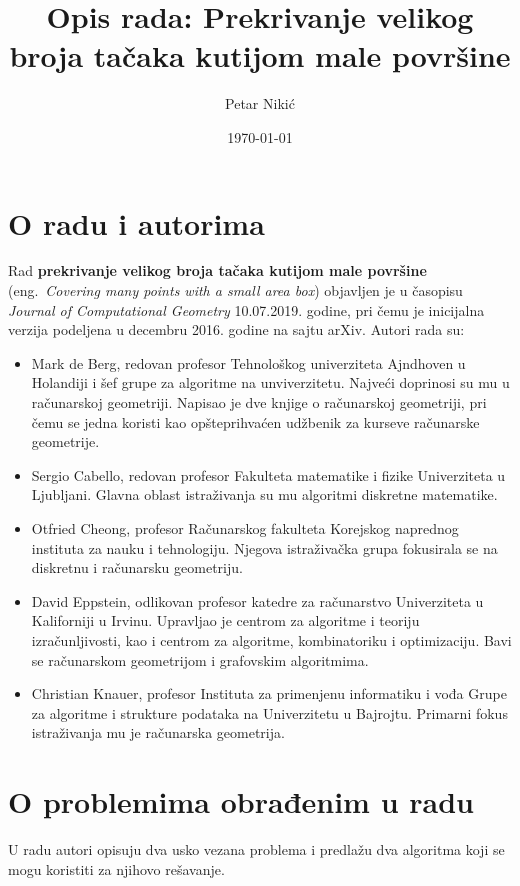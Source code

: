 \documentclass[a4paper]{article}
\title{Opis rada: Prekrivanje velikog broja tačaka kutijom male površine}
\author{Petar Nikić}
\date{\today}
\begin{document}
\maketitle

\section{O radu i autorima}

Rad \textbf{prekrivanje velikog broja tačaka kutijom male površine} (eng.~{\em Covering many points with a small area box})
objavljen je u časopisu {\em Journal of Computational Geometry} 10.07.2019. godine, pri čemu je inicijalna verzija podeljena
u decembru 2016. godine na sajtu arXiv. Autori rada su:

\begin{itemize}
	\item Mark de Berg, redovan profesor Tehnološkog univerziteta Ajndhoven u Holandiji i šef grupe za algoritme na unviverzitetu.
	Najveći doprinosi su mu u računarskoj geometriji. Napisao je dve knjige o računarskoj geometriji, pri čemu se jedna koristi kao
	opšteprihvaćen udžbenik za kurseve računarske geometrije.
	\item Sergio Cabello, redovan profesor Fakulteta matematike i fizike Univerziteta u Ljubljani. Glavna oblast istraživanja su
	mu algoritmi diskretne matematike.
	\item Otfried Cheong, profesor Računarskog fakulteta Korejskog naprednog instituta za nauku i tehnologiju. Njegova istraživačka
	grupa fokusirala se na diskretnu i računarsku geometriju.
	\item David Eppstein, odlikovan profesor katedre za računarstvo Univerziteta u Kaliforniji u Irvinu. Upravljao je centrom
	za algoritme i teoriju izračunljivosti, kao i centrom za algoritme, kombinatoriku i optimizaciju. Bavi se računarskom geometrijom
	i grafovskim algoritmima.
	\item Christian Knauer, profesor Instituta za primenjenu informatiku i vođa Grupe za algoritme i strukture podataka na Univerzitetu
	u Bajrojtu. Primarni fokus istraživanja mu je računarska geometrija.
\end{itemize}

\section{O problemima obrađenim u radu}

U radu autori opisuju dva usko vezana problema i predlažu dva algoritma koji se mogu koristiti za njihovo rešavanje.
\end{document}

